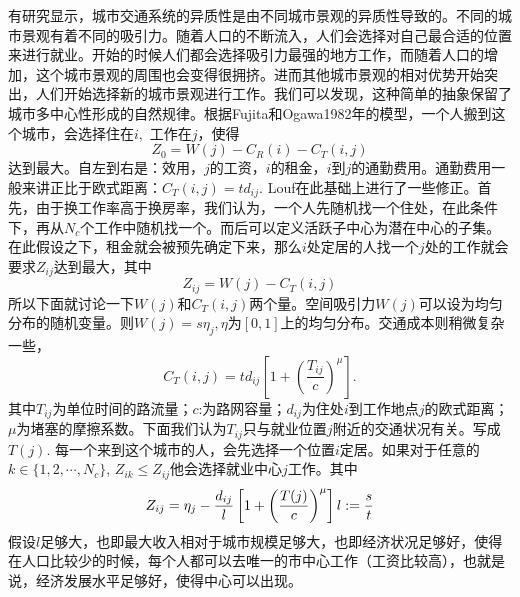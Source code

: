 有研究显示，城市交通系统的异质性是由不同城市景观的异质性导致的\cite{Louf2013}。不同的城市景观有着不同的吸引力。随着人口的不断流入，人们会选择对自己最合适的位置来进行就业。开始的时候人们都会选择吸引力最强的地方工作，而随着人口的增加，这个城市景观的周围也会变得很拥挤。进而其他城市景观的相对优势开始突出，人们开始选择新的城市景观进行工作。我们可以发现，这种简单的抽象保留了城市多中心性形成的自然规律。根据Fujita和Ogawa1982年的模型\cite{fujita1982multiple,ogawa1989nonmonocentric}，一个人搬到这个城市，会选择住在$i,$ 工作在$j$，使得\[Z_0 = W(j)-C_R(i)-C_T(i,j)\]达到最大。自左到右是：效用，$j$的工资，$i$的租金，$i$到$j$的通勤费用。通勤费用一般来讲正比于欧式距离：$C_T(i,j) = td_{ij}$. Louf在此基础上进行了一些修正。首先，由于换工作率高于换房率，我们认为，一个人先随机找一个住处，在此条件下，再从$N_c$个工作中随机找一个。而后可以定义活跃子中心为潜在中心的子集。在此假设之下，租金就会被预先确定下来，那么$i$处定居的人找一个$j$处的工作就会要求$Z_{ij}$达到最大，其中\[Z_{ij} = W(j)-C_T(i,j)\]所以下面就讨论一下$W(j)$和$C_{T}(i,j)$两个量。空间吸引力$W(j)$可以设为均匀分布的随机变量。则$W(j)=s\eta_j,\eta$为$[0,1]$上的均匀分布。交通成本则稍微复杂一些，\[C_T(i,j) = td_{ij}[1+\left( \frac{T_{ij}}{c}\right)^\mu ].\]其中$T_{ij}$为单位时间的路流量；$c$:为路网容量；$d_{ij}$为住处$i$到工作地点$j$的欧式距离；$\mu$为堵塞的摩擦系数。下面我们认为$T_{ij}$只与就业位置$j$附近的交通状况有关。写成$T(j)$. 每一个来到这个城市的人，会先选择一个位置$i$定居。如果对于任意的$k\in\{1,2,\cdots,N_c\}$, $Z_{ik}\le Z_{ij}$他会选择就业中心$j$工作。其中\[Z_{ij} = \eta_j-\frac{d_{ij}}{l}\left[ 1+\left( \frac{T(j)}{c} \right)^\mu \right]\notag\\
l:=\frac{s}t\]假设$l$足够大，也即最大收入相对于城市规模足够大，也即经济状况足够好，使得在人口比较少的时候，每个人都可以去唯一的市中心工作（工资比较高），也就是说，经济发展水平足够好，使得中心可以出现。

